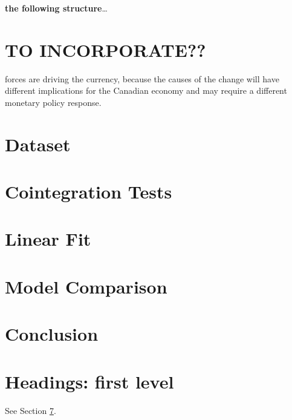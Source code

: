 \documentclass{article}
\begin{document}




\textbf{the following structure}\dots

\section{TO INCORPORATE??}
forces are driving the currency, because the causes of
the change will have different implications for the
Canadian economy and may require a different monetary
policy response. 


\section{Dataset}
\label{sec:part1} %


\section{Cointegration Tests}
\label{sec:part2} %

\section{Linear Fit}
\label{sec:part3} %

\section{Model Comparison}
\label{sec:part4} %

\section{Conclusion}
\label{sec:part5} %

\section{Headings: first level}
\label{sec:headings} %

\lipsum[4] See Section \ref{sec:headings}.
\end{document}
